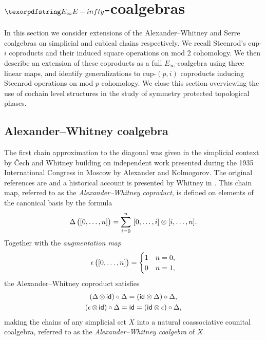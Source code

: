 
\section{$\pdfEinfty$-coalgebras} \label{s:integrally}

In this section we consider extensions of the Alexander--Whitney and Serre coalgebras on simplicial and cubical chains respectively.
We recall Steenrod's cup-$i$ coproducts and their induced square operations on mod 2 cohomology.
We then describe an extension of these coproducts as a full $E_\infty$-coalgebra using three linear maps, and identify generalizations to cup-$(p,i)$ coproducts inducing Steenrod operations on mod $p$ cohomology.
We close this section overviewing the use of cochain level structures in the study of symmetry protected topological phases.

\subsection{Alexander--Whitney coalgebra} \label{ss:aw diagonal}

The first chain approximation to the diagonal was given in the simplicial context by \v{C}ech and Whitney building on independent work presented during the 1935 International Congress in Moscow by Alexander and Kolmogorov.
The original references are \cite{alexander1936ring, cech1936multiplication, whitney1938products} and a historical account is presented by Whitney in \cite[p.110]{whitney1988history}.
This chain map, referred to as the \textit{Alexander--Whitney coproduct}, is defined on elements of the canonical basis by the formula
\begin{equation} \label{e:alexander-whitney coalgebra}
\operatorname{\Delta} \big( [0,\dots,n] \big) = \sum_{i=0}^n \ [0, \dots, i] \otimes [i, \dots, n].
\end{equation}
Together with the \textit{augmentation map}
\begin{equation} \label{e:augmentation map}
\operatorname{\epsilon} \big( [0,\dots,n] \big) =
\begin{cases}
1 & n=0, \\ 0 & n=1,
\end{cases}
\end{equation}
the Alexander--Whitney coproduct satisfies
\begin{gather}
\label{e:coassociativity relation}
(\operatorname{\Delta} \otimes \, \mathsf{id}) \circ \operatorname{\Delta} = (\mathsf{id} \otimes \operatorname{\Delta}) \circ \operatorname{\Delta}, \\
\label{e:counital relation}
(\operatorname{\epsilon} \otimes \, \mathsf{id}) \circ \operatorname{\Delta} = \mathsf{id} = (\mathsf{id} \otimes \operatorname{\epsilon}) \circ \operatorname{\Delta},
\end{gather}
making the chains of any simplicial set $X$ into a natural coassociative counital coalgebra, referred to as the \textit{Alexander--Whitney coalgebra} of $X$.


